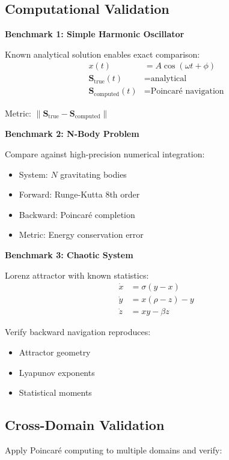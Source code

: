 \documentclass[twocolumn,10pt]{article}
\begin{document}
\subsection{Computational Validation}

\textbf{Benchmark 1: Simple Harmonic Oscillator}

Known analytical solution enables exact comparison:
\begin{align}
x(t) &= A\cos(\omega t + \phi) \\
\mathbf{S}_{\text{true}}(t) &= \text{analytical} \\
\mathbf{S}_{\text{computed}}(t) &= \text{Poincaré navigation}
\end{align}

Metric: $\|\mathbf{S}_{\text{true}} - \mathbf{S}_{\text{computed}}\|$

\textbf{Benchmark 2: N-Body Problem}

Compare against high-precision numerical integration:
\begin{itemize}
\item System: $N$ gravitating bodies
\item Forward: Runge-Kutta 8th order
\item Backward: Poincaré completion
\item Metric: Energy conservation error
\end{itemize}

\textbf{Benchmark 3: Chaotic System}

Lorenz attractor with known statistics:
\begin{align}
\dot{x} &= \sigma(y - x) \\
\dot{y} &= x(\rho - z) - y \\
\dot{z} &= xy - \beta z
\end{align}

Verify backward navigation reproduces:
\begin{itemize}
\item Attractor geometry
\item Lyapunov exponents
\item Statistical moments
\end{itemize}

\subsection{Cross-Domain Validation}

Apply Poincaré computing to multiple domains and verify:
\end{document}
